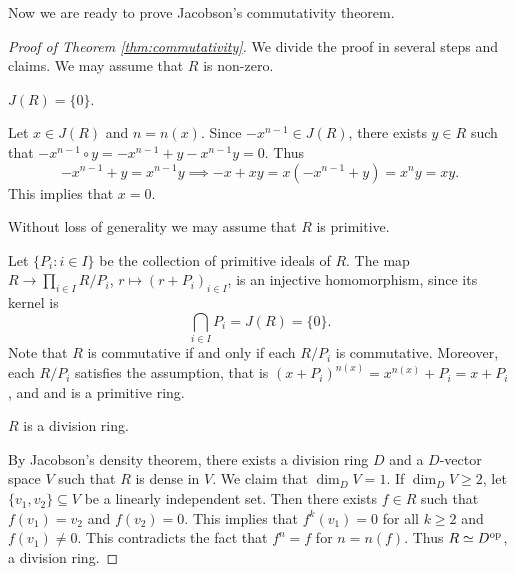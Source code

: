 

Now we are ready to prove Jacobson's commutativity theorem. 

\begin{proof}[Proof of Theorem \ref{thm:commutativity}]
    We divide the proof in several steps and claims. We may assume that 
    $R$ is non-zero. 
    
    \begin{claim}
        $J(R)=\{0\}$. 
    \end{claim}
    
    Let $x\in J(R)$ and $n=n(x)$. Since $-x^{n-1}\in J(R)$, 
    there exists $y\in R$ such that $-x^{n-1}\circ y=-x^{n-1}+y-x^{n-1}y=0$. Thus
    \[
    -x^{n-1}+y=x^{n-1}y\implies
    -x+xy=x(-x^{n-1}+y)=x^ny=xy.
    \]
    This implies that $x=0$.
    
    \begin{claim}
        Without loss of generality we may assume that $R$ is primitive. 
    \end{claim}
	
	Let $\{P_i:i\in I\}$ be the collection of primitive ideals of $R$. 
	The map 
	$R\to \prod_{i\in I}R/P_i$, $r\mapsto (r+P_i)_{i\in I}$, 
	is an injective homomorphism, since
	its kernel is 
	\[
	\bigcap_{i\in I} P_i=J(R)=\{0\}.
	\]
	Note that
	$R$ is commutative if and only if each $R/P_i$ is commutative. Moreover, 
	each $R/P_i$ 
	satisfies the assumption, that is 
	$(x+P_i)^{n(x)}=x^{n(x)}+P_i=x+P_i$, and 
	and is a primitive ring. 
	
    \begin{claim}
        $R$ is a division ring. 
    \end{claim}

    By Jacobson's density theorem,
    there exists a division ring $D$ and 
    a $D$-vector space $V$ such that 
    $R$ is dense in $V$. We claim that $\dim_DV=1$. If $\dim_DV\geq 2$, 
    let $\{v_1,v_2\}\subseteq V$ be a linearly independent set. Then
    there exists $f\in R$ such that $f(v_1)=v_2$ and $f(v_2)=0$. This implies
    that $f^{k}(v_1)=0$ for all $k\geq 2$ and $f(v_1)\ne 0$. This contradicts
    the fact that $f^{n}=f$ for $n=n(f)$. Thus $R\simeq D^{\operatorname{op}}$, 
    a division ring. 
    

\end{proof}
